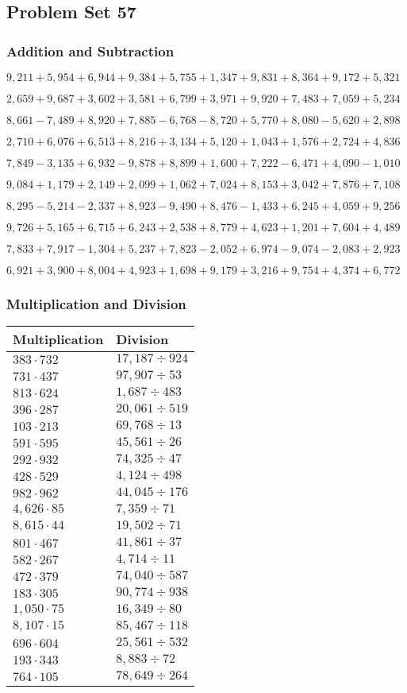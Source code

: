 \hypertarget{problem-set-57-2}{%
\subsection{Problem Set 57}\label{problem-set-57-2}}

\hypertarget{addition-and-subtraction-219}{%
\subsubsection{Addition and
Subtraction}\label{addition-and-subtraction-219}}

\(9,211+5,954+6,944+9,384+5,755+1,347+9,831+8,364+9,172+ 5,321\)

\(2,659+9,687+3,602+3,581+6,799+3,971+9,920+7,483+7,059+5,234\)

\(8,661-7,489+8,920+7,885-6,768-8,720+5,770+8,080-5,620+2,898\)

\(2,710+6,076+6,513+8,216+3,134+5,120+1,043+1,576+2,724+4,836\)

\(7,849-3,135+6,932-9,878+8,899+1,600+7,222-6,471+4,090-1,010\)

\(9,084+1,179+2,149+2,099+1,062+7,024+8,153+3,042+7,876+7,108\)

\(8,295-5,214-2,337+8,923-9,490+8,476-1,433+6,245+4,059+9,256\)

\(9,726+5,165+6,715+6,243+2,538+8,779+4,623+1,201+7,604+4,489\)

\(7,833+7,917-1,304+5,237+7,823-2,052+6,974-9,074-2,083+2,923\)

\(6,921+3,900+8,004+4,923+1,698+9,179+3,216+9,754+4,374+6,772\)

\hypertarget{multiplication-and-division-218}{%
\subsubsection{Multiplication and
Division}\label{multiplication-and-division-218}}

\begin{longtable}[]{@{}ll@{}}
\toprule
Multiplication & Division\tabularnewline
\midrule
\endhead
\(383\cdot732\) & \(17,187÷924\)\tabularnewline
\(731\cdot437\) & \(97,907÷53\)\tabularnewline
\(813\cdot624\) & \(1,687÷483\)\tabularnewline
\(396\cdot287\) & \(20,061÷519\)\tabularnewline
\(103\cdot213\) & \(69,768÷13\)\tabularnewline
\(591\cdot595\) & \(45,561÷26\)\tabularnewline
\(292\cdot932\) & \(74,325÷47\)\tabularnewline
\(428\cdot529\) & \(4,124÷498\)\tabularnewline
\(982\cdot962\) & \(44,045÷176\)\tabularnewline
\(4,626\cdot85\) & \(7,359÷71\)\tabularnewline
\(8,615\cdot44\) & \(19,502÷71\)\tabularnewline
\(801\cdot467\) & \(41,861÷37\)\tabularnewline
\(582\cdot267\) & \(4,714÷11\)\tabularnewline
\(472\cdot379\) & \(74,040÷587\)\tabularnewline
\(183\cdot305\) & \(90,774÷938\)\tabularnewline
\(1,050\cdot75\) & \(16,349÷80\)\tabularnewline
\(8,107\cdot15\) & \(85,467÷118\)\tabularnewline
\(696\cdot604\) & \(25,561÷532\)\tabularnewline
\(193\cdot343\) & \(8,883÷72\)\tabularnewline
\(764\cdot105\) & \(78,649÷264\)\tabularnewline
\bottomrule
\end{longtable}

